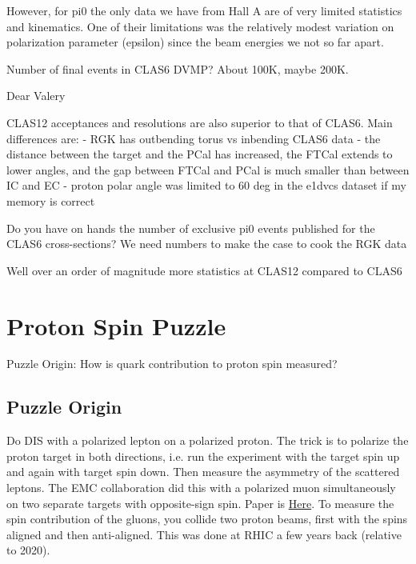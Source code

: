  However, for pi0 the only data we have from Hall A are of very limited statistics and kinematics. One of their limitations was the relatively modest variation on polarization parameter (epsilon) since the beam energies we not so far apart. 
 
 Number of final events in CLAS6 DVMP? About 100K, maybe 200K. 
 
 
 
 Dear Valery

CLAS12 acceptances and resolutions are also superior to that of CLAS6. Main differences are:
- RGK has outbending torus vs inbending CLAS6 data
- the distance between the target and the PCal has increased, the FTCal extends to lower angles, and the gap between FTCal and PCal is much smaller than between IC and EC
- proton polar angle was limited to 60 deg in the e1dvcs dataset if my memory is correct

Do you have on hands the number of exclusive pi0 events published for the CLAS6 cross-sections?
We need numbers to make the case to cook the RGK data

Well over an order of magnitude more statistics at CLAS12 compared to CLAS6


\section{Proton Spin Puzzle}
    Puzzle Origin: How is quark contribution to proton spin measured?
    \subsection{Puzzle Origin}
        Do DIS with a polarized lepton on a polarized proton. The trick is to polarize the proton target in both directions, i.e. run the experiment with the target spin up and again with target spin down. Then measure the asymmetry of the scattered leptons. The EMC collaboration did this with a polarized muon simultaneously on two separate targets with opposite-sign spin. Paper is \href{https://www-sciencedirect-com.libproxy.mit.edu/science/article/pii/0550321389900898?via\%3Dihub}{Here}. To measure the spin contribution of the gluons, you collide two proton beams, first with the spins aligned and then anti-aligned. This was done at RHIC a few years back (relative to 2020). 
